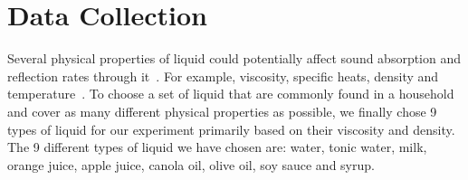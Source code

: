 \documentclass{article} %
\begin{document}




\section{Data Collection}
\label{sec:dataCollection}
Several physical properties of liquid could potentially affect sound absorption and reflection rates through it~\cite{parthasarathy1955sound}. For example, viscosity, specific heats, density and temperature~\cite{absorb}. To choose a set of liquid that are commonly found in a household and cover as many different physical properties as possible, we finally chose 9 types of liquid for our experiment primarily based on their viscosity and density. The 9 different types of liquid we have chosen are: water, tonic water, milk, orange juice, apple juice, canola oil, olive oil, soy sauce and syrup.   
\end{document}
